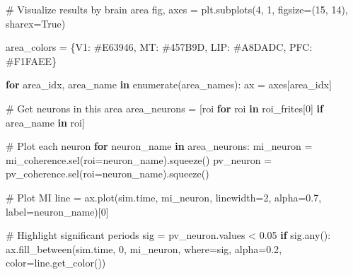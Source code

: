 \documentclass[
  11pt,
  letterpaper,
  oneside,
  openany]{book}
\newenvironment{Shaded}{\begin{snugshade}}{\end{snugshade}}
\newcommand{\BuiltInTok}[1]{\textcolor[rgb]{0.00,0.23,0.31}{#1}}
\newcommand{\CommentTok}[1]{\textcolor[rgb]{0.37,0.37,0.37}{#1}}
\newcommand{\ControlFlowTok}[1]{\textcolor[rgb]{0.00,0.23,0.31}{\textbf{#1}}}
\newcommand{\DecValTok}[1]{\textcolor[rgb]{0.68,0.00,0.00}{#1}}
\newcommand{\FloatTok}[1]{\textcolor[rgb]{0.68,0.00,0.00}{#1}}
\newcommand{\KeywordTok}[1]{\textcolor[rgb]{0.00,0.23,0.31}{\textbf{#1}}}
\newcommand{\NormalTok}[1]{\textcolor[rgb]{0.00,0.23,0.31}{#1}}
\newcommand{\OperatorTok}[1]{\textcolor[rgb]{0.37,0.37,0.37}{#1}}
\newcommand{\StringTok}[1]{\textcolor[rgb]{0.13,0.47,0.30}{#1}}
\newcommand{\VariableTok}[1]{\textcolor[rgb]{0.07,0.07,0.07}{#1}}
\begin{document}
\begin{Shaded}
\begin{Highlighting}[]
\CommentTok{\# Visualize results by brain area}
\NormalTok{fig, axes }\OperatorTok{=}\NormalTok{ plt.subplots(}\DecValTok{4}\NormalTok{, }\DecValTok{1}\NormalTok{, figsize}\OperatorTok{=}\NormalTok{(}\DecValTok{15}\NormalTok{, }\DecValTok{14}\NormalTok{), sharex}\OperatorTok{=}\VariableTok{True}\NormalTok{)}

\NormalTok{area\_colors }\OperatorTok{=}\NormalTok{ \{}\StringTok{\textquotesingle{}V1\textquotesingle{}}\NormalTok{: }\StringTok{\textquotesingle{}\#E63946\textquotesingle{}}\NormalTok{, }\StringTok{\textquotesingle{}MT\textquotesingle{}}\NormalTok{: }\StringTok{\textquotesingle{}\#457B9D\textquotesingle{}}\NormalTok{, }\StringTok{\textquotesingle{}LIP\textquotesingle{}}\NormalTok{: }\StringTok{\textquotesingle{}\#A8DADC\textquotesingle{}}\NormalTok{, }\StringTok{\textquotesingle{}PFC\textquotesingle{}}\NormalTok{: }\StringTok{\textquotesingle{}\#F1FAEE\textquotesingle{}}\NormalTok{\}}

\ControlFlowTok{for}\NormalTok{ area\_idx, area\_name }\KeywordTok{in} \BuiltInTok{enumerate}\NormalTok{(area\_names):}
\NormalTok{    ax }\OperatorTok{=}\NormalTok{ axes[area\_idx]}
    
    \CommentTok{\# Get neurons in this area}
\NormalTok{    area\_neurons }\OperatorTok{=}\NormalTok{ [roi }\ControlFlowTok{for}\NormalTok{ roi }\KeywordTok{in}\NormalTok{ roi\_frites[}\DecValTok{0}\NormalTok{] }\ControlFlowTok{if}\NormalTok{ area\_name }\KeywordTok{in}\NormalTok{ roi]}
    
    \CommentTok{\# Plot each neuron}
    \ControlFlowTok{for}\NormalTok{ neuron\_name }\KeywordTok{in}\NormalTok{ area\_neurons:}
\NormalTok{        mi\_neuron }\OperatorTok{=}\NormalTok{ mi\_coherence.sel(roi}\OperatorTok{=}\NormalTok{neuron\_name).squeeze()}
\NormalTok{        pv\_neuron }\OperatorTok{=}\NormalTok{ pv\_coherence.sel(roi}\OperatorTok{=}\NormalTok{neuron\_name).squeeze()}
        
        \CommentTok{\# Plot MI}
\NormalTok{        line }\OperatorTok{=}\NormalTok{ ax.plot(sim.time, mi\_neuron, linewidth}\OperatorTok{=}\DecValTok{2}\NormalTok{, }
\NormalTok{                      alpha}\OperatorTok{=}\FloatTok{0.7}\NormalTok{, label}\OperatorTok{=}\NormalTok{neuron\_name)[}\DecValTok{0}\NormalTok{]}
        
        \CommentTok{\# Highlight significant periods}
\NormalTok{        sig }\OperatorTok{=}\NormalTok{ pv\_neuron.values }\OperatorTok{\textless{}} \FloatTok{0.05}
        \ControlFlowTok{if}\NormalTok{ sig.}\BuiltInTok{any}\NormalTok{():}
\NormalTok{            ax.fill\_between(sim.time, }\DecValTok{0}\NormalTok{, mi\_neuron, where}\OperatorTok{=}\NormalTok{sig,}
\NormalTok{                          alpha}\OperatorTok{=}\FloatTok{0.2}\NormalTok{, color}\OperatorTok{=}\NormalTok{line.get\_color())}
    

\end{Highlighting}
\end{Shaded}
\end{document}
